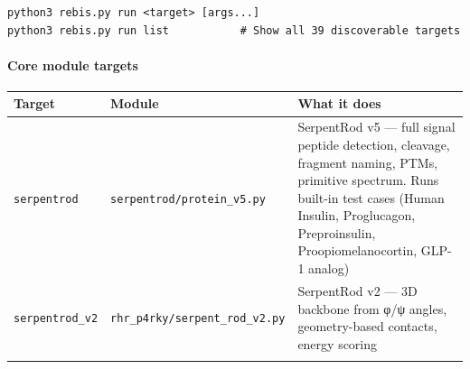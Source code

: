 \documentclass[12pt,a4paper]{article}
\begin{document}
\begin{verbatim}
python3 rebis.py run <target> [args...]
python3 rebis.py run list           # Show all 39 discoverable targets
\end{verbatim}

\hypertarget{core-module-targets}{%
\paragraph{Core module targets}\label{core-module-targets}}

\begin{longtable}[]{@{}lll@{}}
\toprule
\begin{minipage}[b]{0.24\columnwidth}\raggedright
Target\strut
\end{minipage} & \begin{minipage}[b]{0.24\columnwidth}\raggedright
Module\strut
\end{minipage} & \begin{minipage}[b]{0.43\columnwidth}\raggedright
What it does\strut
\end{minipage}\tabularnewline
\midrule
\endhead
\begin{minipage}[t]{0.24\columnwidth}\raggedright
\texttt{serpentrod}\strut
\end{minipage} & \begin{minipage}[t]{0.24\columnwidth}\raggedright
\texttt{serpentrod/protein\_v5.py}\strut
\end{minipage} & \begin{minipage}[t]{0.43\columnwidth}\raggedright
SerpentRod v5 --- full signal peptide detection, cleavage, fragment
naming, PTMs, primitive spectrum. Runs built-in test cases (Human
Insulin, Proglucagon, Preproinsulin, Proopiomelanocortin, GLP-1
analog)\strut
\end{minipage}\tabularnewline
\begin{minipage}[t]{0.24\columnwidth}\raggedright
\texttt{serpentrod\_v2}\strut
\end{minipage} & \begin{minipage}[t]{0.24\columnwidth}\raggedright
\texttt{rhr\_p4rky/serpent\_rod\_v2.py}\strut
\end{minipage} & \begin{minipage}[t]{0.43\columnwidth}\raggedright
SerpentRod v2 --- 3D backbone from φ/ψ angles, geometry-based contacts,
energy scoring\strut
\end{minipage}\tabularnewline
\begin{minipage}[t]{0.24\columnwidth}\raggedright

\end{minipage}
\end{longtable}
\end{document}
